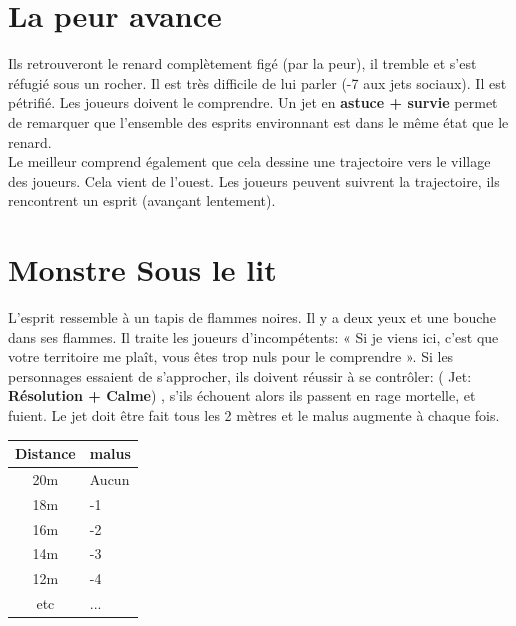 \documentclass[oneside,12pt]{book}
\newcommand\roll[1]{
( Jet: \textbf{#1})
}
\begin{document}
\begin{flushleft}
\section{La peur avance}
Ils retrouveront le renard complètement figé (par la peur), il tremble et s'est réfugié sous un rocher. Il est très difficile de lui parler (-7 aux jets sociaux). Il est pétrifié. Les joueurs doivent le comprendre. Un jet en \textbf{astuce + survie} permet de remarquer que l’ensemble des esprits environnant est dans le même état que le renard.\\
Le meilleur comprend également que cela dessine une trajectoire vers le village des joueurs. Cela vient de l'ouest. Les joueurs peuvent suivrent la trajectoire, ils rencontrent un esprit (avançant lentement). 

\section{Monstre Sous le lit}
L'esprit ressemble à un tapis de flammes noires. Il y a deux yeux et une bouche dans ses flammes. Il traite les joueurs d'incompétents: « Si je viens ici, c'est que votre territoire me plaît, vous êtes trop nuls pour le comprendre ».
Si les personnages essaient de s'approcher, ils doivent réussir à se contrôler:  \roll{Résolution + Calme}, s'ils échouent alors ils passent en rage mortelle, et fuient. 
Le jet doit être fait tous les 2 mètres et le malus augmente à chaque fois. \\

\begin{tabularx}{100pt}{|c|X|}
\hline
Distance & malus\\
\hline
20m & Aucun\\
\hline
18m & -1\\
\hline
16m & -2\\
\hline
14m & -3\\
\hline
12m & -4\\
\hline
etc & ...\\
\hline
\end{tabularx} \\


\end{flushleft}
\end{document}
